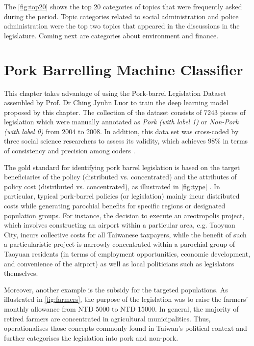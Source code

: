 The \autoref{fig:top20} shows the top 20 categories of topics that were frequently asked during the period. Topic categories related to social administration and police administration were the top two topics that appeared in the discussions in the legislature. Coming next are categories about environment and finance. 



\section*{\centering Pork Barrelling Machine Classifier}

This chapter takes advantage of using the Pork-barrel Legislation Dataset assembled by Prof. Dr Ching Jyuhn Luor \citep{Luor2008, Luor2009, Luor2012} to train the deep learning model proposed by this chapter. The collection of the dataset consists of 7243 pieces of legislation which were manually annotated as \textit{Pork (with label 1)} or \textit{Non-Pork (with label 0)} from 2004 to 2008. In addition, this data set was cross-coded by three social science researchers to assess its validity, which achieves 98\% in terms of consistency and precision among coders \citep{Luor2008,Luor2009}. 



The gold standard for identifying pork barrel legislation is based on the target beneficiaries of the policy (distributed vs. concentrated) and the attributes of policy cost (distributed vs. concentrated), as illustrated in \autoref{fig:type}  \citep{Wilson2001}. In particular, typical pork-barrel policies (or legislation) mainly incur distributed costs while generating parochial benefits for specific regions or designated population groups. For instance, the decision to execute an areotropolis project, which involves constructing an airport within a particular area, e.g. Taoyuan City, incurs collective costs for all Taiwanese taxpayers, while the benefit of such a particularistic project is narrowly concentrated within a parochial group of Taoyuan residents (in terms of employment opportunities, economic development, and convenience of the airport) as well as local politicians such as legislators themselves. 

Moreover, another example is the subsidy for the targeted populations. As illustrated in \autoref{fig:farmers}, the purpose of the legislation was to raise the farmers' monthly allowance from NTD 5000 to NTD 15000. In general, the majority of retired farmers are concentrated in agricultural municipalities. Thus, \citet{Luor2008, Luor2009} operationalises those concepts commonly found in Taiwan's political context and further categorises the legislation into pork and non-pork.

